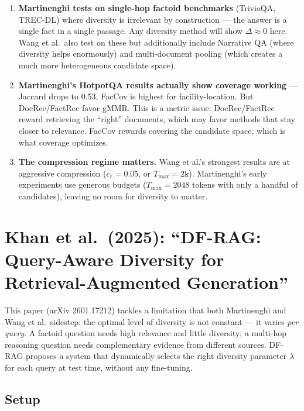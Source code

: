 \documentclass[11pt,a4paper]{article}
\begin{document}
\begin{enumerate}[leftmargin=*]
	\item \textbf{Martinenghi tests on single-hop factoid benchmarks} (TriviaQA, TREC-DL) where diversity is irrelevant by construction --- the answer is a single fact in a single passage. Any diversity method will show $\Delta \approx 0$ here. Wang et al.\ also test on these but additionally include Narrative QA (where diversity helps enormously) and multi-document pooling (which creates a much more heterogeneous candidate space).
	\item \textbf{Martinenghi's HotpotQA results actually show coverage working} --- Jaccard drops to 0.53, FacCov is highest for facility-location. But DocRec/FactRec favor gMMR. This is a metric issue: DocRec/FactRec reward retrieving the ``right'' documents, which may favor methods that stay closer to relevance. FacCov rewards covering the candidate space, which is what coverage optimizes.
	\item \textbf{The compression regime matters.} Wang et al.'s strongest results are at aggressive compression ($c_r = 0.05$, or $T_{\max} = 2\text{k}$). Martinenghi's early experiments use generous budgets ($T_{\max} = 2048$ tokens with only a handful of candidates), leaving no room for diversity to matter.
\end{enumerate}

\newpage
\section{Khan et al.\ (2025): ``DF-RAG: Query-Aware Diversity for Retrieval-Augmented Generation''}

This paper (arXiv 2601.17212) tackles a limitation that both Martinenghi and Wang et al.\ sidestep: the optimal level of diversity is not constant --- it varies \emph{per query}. A factoid question needs high relevance and little diversity; a multi-hop reasoning question needs complementary evidence from different sources. DF-RAG proposes a system that dynamically selects the right diversity parameter $\lambda$ for each query at test time, without any fine-tuning.

\subsection{Setup}
\end{document}
